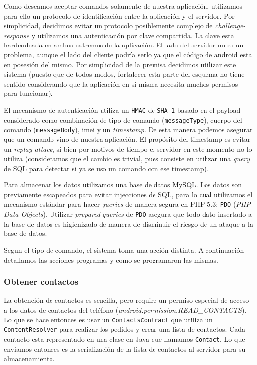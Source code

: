 Como deseamos aceptar comandos solamente de nuestra aplicación, utilizamos para ello un protocolo de identificación entre la aplicación y el servidor. Por simplicidad, decidimos evitar un protocolo posiblemente complejo de \textit{challenge-response} y utilizamos una autenticación por clave compartida. La clave esta hardcodeada en ambos extremos de la aplicación. El lado del servidor no es un problema, aunque el lado del cliente podría serlo ya que el código de android esta en posesión del mismo. Por simplicidad de la premisa decidimos utilizar este sistema (puesto que de todos modos, fortalecer esta parte del esquema no tiene sentido considerando que la aplicación en si misma necesita muchos permisos para funcionar).

El mecanismo de autenticación utiliza un \texttt{HMAC} de \texttt{SHA-1} basado en el payload considerado como combinación de tipo de comando (\texttt{messageType}), cuerpo del comando (\texttt{messageBody}), imei y un \textit{timestamp}. De esta manera podemos asegurar que un comando vino de nuestra aplicación. El propósito del timestamp es evitar un \textit{replay-attack}, si bien por motivos de tiempo el servidor en este momento no lo utiliza (consideramos que el cambio es trivial, pues consiste en utilizar una \textit{query} de SQL para detectar si ya se uso un comando con ese timestamp).

Para almacenar los datos utilizamos una base de datos MySQL. Los datos son previamente escapeados para evitar injecciones de SQL, para lo cual utilizamos el mecanismo estándar para hacer \textit{queries} de manera segura en PHP 5.3: \texttt{PDO} (\textit{PHP Data Objects}). Utilizar \textit{prepared queries} de \texttt{PDO} asegura que todo dato insertado a la base de datos es higienizado de manera de disminuir el riesgo de un ataque a la base de datos.

Segun el tipo de comando, el sistema toma una acción distinta. A continuación detallamos las acciones programas y como se programaron las mismas.

\subsubsection{Obtener contactos}

La obtención de contactos es sencilla, pero require un permiso especial de acceso a los
datos de contactos del teléfono (\textit{android.permission.READ\_CONTACTS}). Lo que se hace
entonces es usar un \texttt{ContactsContract} que utiliza un \texttt{ContentResolver} para
realizar los pedidos y crear una lista de contactos. Cada contacto esta representado en una
clase en Java que llamamos \texttt{Contact}. Lo que enviamos entonces es la serialización
de la lista de contactos al servidor para su almacenamiento.

